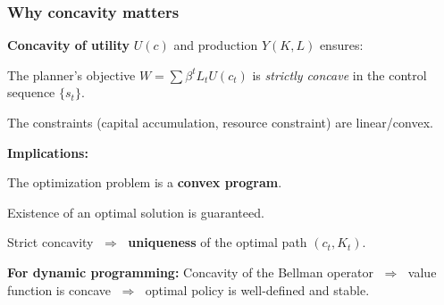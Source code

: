 \documentclass[xcolor=x11names,compress,aspectratio=169]{beamer}%
\makeatletter
\renewenvironment{itemize}{\begin{compactitemize}[<+-| alert@+>]}{\end{compactitemize}}
\makeatother
\begin{document}
\begin{frame}%
%

\frametitle{Why concavity matters}%


\begin{itemize}
\item \textbf{Concavity of utility} $U(c)$ and production $Y(K,L)$ ensures:

\begin{itemize}
\item The planner's objective $W = \sum\beta^{t} L_{t} U(c_{t})$ is
\emph{strictly concave} in the control sequence $\{s_{t}\}$.

\item The constraints (capital accumulation, resource constraint) are linear/convex.
\end{itemize}

\vspace{0.4cm}

\item \textbf{Implications:}

\begin{itemize}
\item The optimization problem is a \textbf{convex program}.

\item Existence of an optimal solution is guaranteed.

\item Strict concavity $\;\Rightarrow\;$ \textbf{uniqueness} of the optimal
path $(c_{t},K_{t})$.
\end{itemize}

\vspace{0.4cm}

\item \textbf{For dynamic programming:} Concavity of the Bellman operator
$\;\Rightarrow\;$ value function is concave $\;\Rightarrow\;$ optimal policy
is well-defined and stable.
\end{itemize}

%

\transboxout
\end{frame}%
\end{document}
